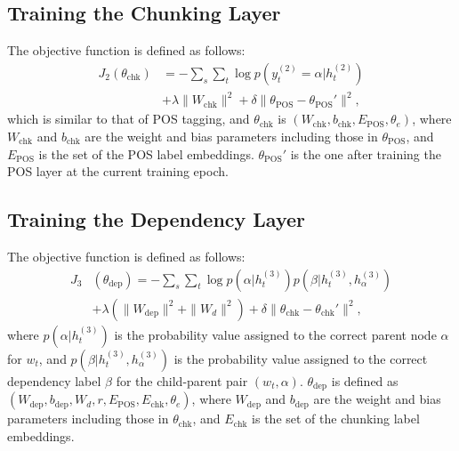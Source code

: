 \documentclass[11pt,a4paper]{article}
\begin{document}
\subsection{Training the Chunking Layer}
\label{subsec:trainingChunking}
The objective function is defined as follows:
\begin{equation}
\begin{split}
J_2(\theta_{\mathrm{chk}})&=-\sum_{s}\sum_{t}\log{p(y_t^{(2)}=\alpha|h_t^{(2)})}\\
&+\lambda\|W_{\mathrm{chk}}\|^2+\delta\|\theta_{\mathrm{POS}}-\theta_{\mathrm{POS}}'\|^2,
\end{split}
\end{equation}
which is similar to that of POS tagging, and $\theta_{\mathrm{chk}}$ is $(W_{\mathrm{chk}}, b_{\mathrm{chk}}, E_{\mathrm{POS}}, \theta_{e})$, where $W_{\mathrm{chk}}$ and $b_{\mathrm{chk}}$ are the weight and bias parameters including those in $\theta_{\mathrm{POS}}$, and $E_{\mathrm{POS}}$ is the set of the POS label embeddings.
$\theta_{\mathrm{POS}}'$ is the one after training the POS layer at the current training epoch.


\subsection{Training the Dependency Layer}
The objective function is defined as follows:
\begin{equation}
\begin{split}
J_3&(\theta_{\mathrm{dep}})=-\sum_{s}\sum_{t}\log{p(\alpha|h_t^{(3)})p(\beta|h_t^{(3)},h_\alpha^{(3)})}\\
&+\lambda(\|W_{\mathrm{dep}}\|^2+\|W_d\|^2)+\delta\|\theta_{\mathrm{chk}}-\theta_{\mathrm{chk}}'\|^2,
\end{split}
\end{equation}
where $p(\alpha|h_t^{(3)})$ is the probability value assigned to the correct parent node $\alpha$ for $w_t$, and $p(\beta|h_t^{(3)}, h_\alpha^{(3)})$ is the probability value assigned to the correct dependency label $\beta$ for the child-parent pair $(w_t, \alpha)$.
$\theta_{\mathrm{dep}}$ is defined as $(W_{\mathrm{dep}}, b_{\mathrm{dep}}, W_d, r,  E_{\mathrm{POS}}, E_{\mathrm{chk}}, \theta_{e})$, where $W_{\mathrm{dep}}$ and $b_{\mathrm{dep}}$ are the weight and bias parameters including those in $\theta_{\mathrm{chk}}$, and $E_{\mathrm{chk}}$ is the set of the chunking label embeddings.
\end{document}
